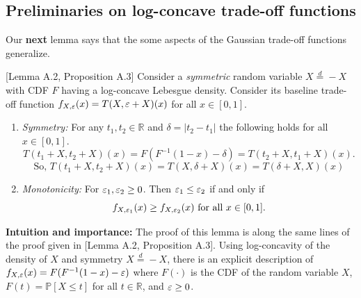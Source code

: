 \subsection{Preliminaries on log-concave trade-off functions}\label{sec:prelimLCTOF}
Our \textbf{next} lemma says that the some aspects of the Gaussian trade-off functions generalize. 
\begin{lemma}\cite{dong2022gaussian}[Lemma A.2, Proposition A.3] \label{lem:SLCTOF}
Consider a \textit{symmetric} random variable $X\overset{d}{=} -X$ with CDF $F$ having a log-concave Lebesgue density. Consider its  baseline trade-off function $f_{X,\varepsilon}(x)=T(X,\varepsilon+X)(x)$ for all $x \in [0,1]$. 
\begin{enumerate}
    \item \textit{Symmetry:} For any $t_1,t_2 \in \mathbb{R}$ and $\delta = |t_2- t_1|$ the following holds  for all $x \in [0,1]$.
    \begin{equation}
T(t_1+X, t_2+X)(x) = F\left(F^{-1}(1-x)-\delta \right)=T(t_2+X,t_1+X)(x). 
\end{equation}
\begin{equation}
\text{So, }T(t_1+X, t_2+X)(x)= T(X,\delta+X)(x)=T(\delta+X,X)(x) 
\end{equation}
\item \textit{Monotonicity:}
For $\varepsilon_1 ,\varepsilon_2 \geq 0$. Then $\varepsilon_1 \leq \varepsilon_2$ if and only if 
\begin{equation}
    f_{X,\varepsilon_1}(x) \geq f_{X,\varepsilon_2}(x) \text{ for all } x \in [0,1].
\end{equation}
\end{enumerate}
\end{lemma}
\textbf{Intuition and importance:}  The proof of this lemma is along the same lines of the proof given in \cite{dong2022gaussian}[Lemma A.2, Proposition A.3]. Using log-concavity of the density of $X$ and symmetry $X \overset{d}{=}-X$, there is an explicit description of $f_{X, \varepsilon}(x)=F(F^{-1}(1-x) - \varepsilon)$ where $F(\cdot)$ is the CDF of the random variable $X$, $F(t)= \mathbb{P}[X\leq t]$ for all $t\in \mathbb{R}$, and $\varepsilon \geq 0$.

